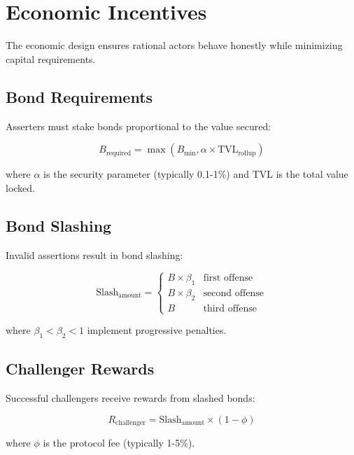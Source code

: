 \section{Economic Incentives}


The economic design ensures rational actors behave honestly while minimizing capital requirements.

\subsection{Bond Requirements}

Asserters must stake bonds proportional to the value secured:

\begin{equation}
B_{\text{required}} = \max(B_{\text{min}}, \alpha \times \text{TVL}_{\text{rollup}})
\end{equation}

where $\alpha$ is the security parameter (typically 0.1-1\%) and TVL is the total value locked.

\subsection{Bond Slashing}

Invalid assertions result in bond slashing:

\begin{equation}
\text{Slash}_{\text{amount}} = \begin{cases}
B \times \beta_1 & \text{first offense} \\
B \times \beta_2 & \text{second offense} \\
B & \text{third offense}
\end{cases}
\end{equation}

where $\beta_1 < \beta_2 < 1$ implement progressive penalties.

\subsection{Challenger Rewards}

Successful challengers receive rewards from slashed bonds:

\begin{equation}
R_{\text{challenger}} = \text{Slash}_{\text{amount}} \times (1 - \phi)
\end{equation}

where $\phi$ is the protocol fee (typically 1-5\%).

